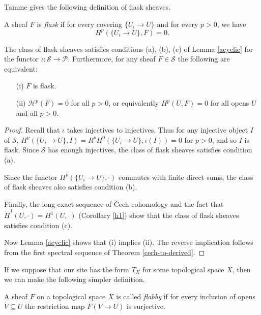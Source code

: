 Tamme \cite{etale} gives the following definition of flask sheaves.

\begin{defn} A sheaf $F$ is \emph{flask} if for every covering $\{U_i\rightarrow U\}$ and for every $p > 0$, we have
\[
H^p(\{U_i\rightarrow U\},F) = 0.
\]
\end{defn}

\begin{prop}\label{flask} The class of flask sheaves satisfies conditions {\rm (a), (b), (c)} of Lemma \ref{acyclic} for the functor $\iota : \mathcal{S} \rightarrow \mathcal{P}$. Furthermore, for any sheaf $F\in \mathcal{S}$ the following are equivalent:
\begin{itemize}
\item[{\rm (i)}] $F$ is flask.

\item[{\rm (ii)}] $\mathcal{H}^p(F) = 0$ for all $p > 0$, or equivalently $H^p(U,F) = 0$ for all opens $U$ and all $p > 0$.
\end{itemize}
\end{prop}
\begin{proof} Recall that $\iota$ takes injectives to injectives. Thus for any injective object $I$ of $\mathcal{S}$, $H^p(\{U_i\rightarrow U\},I) = R^pH^0(\{U_i\rightarrow U\},\iota(I)) = 0$ for $p > 0$, and so $I$ is flask. Since $\mathcal{S}$ has enough injectives, the class of flask sheaves satisfies condition (a).

Since the functor $H^p(\{U_i\rightarrow U\},\cdot)$ commutes with finite direct sums, the class of flask sheaves also satisfies condition (b).

Finally, the long exact sequence of \v{C}ech cohomology and the fact that $\check{H}^1(U,\cdot) = H^1(U,\cdot)$ (Corollary \ref{h1}) show that the class of flask sheaves satisfies condition (c).

Now Lemma \ref{acyclic} shows that (i) implies (ii). The reverse implication follows from the first spectral sequence of Theorem \ref{cech-to-derived}.
\end{proof}

If we suppose that our site has the form $T_X$ for some topological space $X$, then we can make the following simpler definition.

\begin{defn} A sheaf $F$ on a topological space $X$ is called \emph{flabby} if for every inclusion of opens $V\subseteq U$ the restriction map $F(V\rightarrow U)$ is surjective.
\end{defn}

